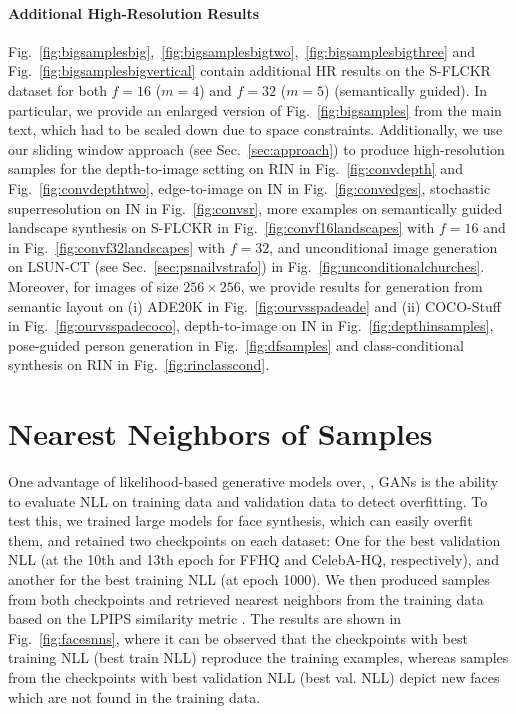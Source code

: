 \documentclass[final]{cvpr}
\begin{document}
\paragraph{Additional High-Resolution Results}
Fig.~\ref{fig:bigsamplesbig},~\ref{fig:bigsamplesbigtwo},~\ref{fig:bigsamplesbigthree} and Fig.~\ref{fig:bigsamplesbigvertical} contain additional HR results on the S-FLCKR dataset for both $f=16$ ($m=4$) and $f=32$ ($m=5$) (semantically guided). In particular, we provide an enlarged version of Fig.~\ref{fig:bigsamples} from the main text, which had to be scaled down due to space constraints. Additionally, we use our sliding window approach (see Sec.~\ref{sec:approach}) to produce high-resolution samples for the depth-to-image setting on RIN in Fig.~\ref{fig:convdepth} and Fig.~\ref{fig:convdepthtwo}, edge-to-image on IN in Fig.~\ref{fig:convedges}, stochastic superresolution on IN in Fig.~\ref{fig:convsr}, more examples on semantically guided landscape synthesis on S-FLCKR in Fig.~\ref{fig:convf16landscapes} with $f=16$ and in Fig.~\ref{fig:convf32landscapes} with $f=32$, and unconditional image generation on LSUN-CT (see Sec.~\ref{sec:psnailvstrafo}) in Fig.~\ref{fig:unconditionalchurches}. Moreover, for images of size $256 \times 256$, we provide results for generation from semantic layout on (i) ADE20K in Fig.~\ref{fig:ourvsspadeade} and (ii) COCO-Stuff in Fig.~\ref{fig:ourvsspadecoco}, depth-to-image on IN in Fig.~\ref{fig:depthinsamples}, pose-guided person generation in Fig.~\ref{fig:dfsamples} and class-conditional synthesis on RIN in Fig.~\ref{fig:rinclasscond}.
\bigsamplesbig
\bigsamplesbigtwo
\bigsamplesbigthree
\bigsamplesbigvertical
%
\convdepth
\convdepthtwo
\artsyedges
%
\convsr
\convlandscapessixteen
\convlandscapesthirtytwo

\unconditionalchurches

%
%
\ourvsspadeade
\ourvsspadecoco

\indepthsamples
\sticktoreal
%
%
\rinclasscond
%

\section{Nearest Neighbors of Samples}
\label{supp:nns}
\noindent One advantage of likelihood-based generative models over, \eg, GANs is the
ability to evaluate NLL on training data and validation data to detect
overfitting. To test this, we trained large models for face synthesis, which
can easily overfit them, and retained two checkpoints on each dataset: One for
the best validation NLL (at the 10th and 13th epoch for FFHQ and CelebA-HQ,
respectively), and another for the best training NLL (at epoch 1000). We then
produced samples from both checkpoints and retrieved nearest neighbors from the
training data based on the LPIPS similarity metric \cite{zhang2018perceptual}. The
results are shown in Fig.~\ref{fig:facesnns}, where it can be observed that the
checkpoints with best training NLL (best train NLL) reproduce the training
examples, whereas samples from the checkpoints with best validation NLL (best
val. NLL) depict new faces which are not found in the training data.
\end{document}
